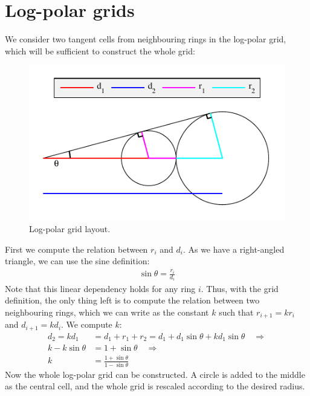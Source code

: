 \documentclass[thesis.tex]{subfiles}
\begin{document}
\section{Log-polar grids}
%
We consider two tangent cells from neighbouring rings in the log-polar grid, which will be sufficient to construct the whole grid:
%
\begin{figure}[H]
	\centering
	\includegraphics[width=\textwidth]{img/gridLayoutDerivationNormal.pdf}
   	\caption{Log-polar grid layout.}
  	\label{fig:gridLayoutDerivationNormal}
\end{figure}
\noindent
%
First we compute the relation between $r_i$ and $d_i$. As we have a right-angled triangle, we can use the sine definition:
%
\begin{align}
\sin \theta = \frac{r_i}{d_i}
\label{eq:radiusDistanceRelation}
\end{align}
%
Note that this linear dependency holds for any ring $i$. Thus, with the grid definition, the only thing left is to compute the relation between two neighbouring rings, which we can write as the constant $k$ such that $r_{i+1} = k r_i$ and $d_{i+1} = k d_i$. We compute $k$:
%
\begin{align*}
d_2 = k d_1 &= d_1 + r_1 + r_2 = d_1 + d_1 \sin \theta + k d_1 \sin \theta \quad\Rightarrow \\
k - k \sin \theta &= 1 + \sin \theta \quad\Rightarrow \\
k &= \frac{1 + \sin \theta}{1 - \sin \theta}
\end{align*}
%
Now the whole log-polar grid can be constructed. A circle is added to the middle as the central cell, and the whole grid is rescaled according to the desired radius.
%
\end{document}
